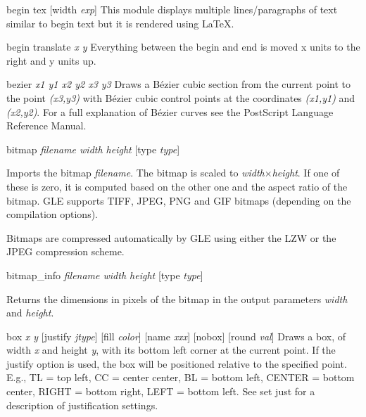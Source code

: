 \begin{commanddescription}
\item[{\sf begin tex [width {\it exp}] }  ]
 This module displays multiple lines/paragraphs of text similar to begin text but it is rendered using \LaTeX.


\item[{\sf begin translate {\it x y}}]
 Everything between the {\sf begin} and {\sf end} is moved
x units to the right and y units up.

\item[{\sf bezier {\it x1 y1 x2 y2 x3 y3}}]
Draws a B\'{e}zier cubic section from the current point to the point
{\it (x3,y3)} with B\'{e}zier cubic control points at the coordinates
{\it (x1,y1)} and {\it (x2,y2)}.  For a full explanation of B\'{e}zier curves
see the PostScript Language Reference Manual.


\item[{\sf bitmap {\it filename width height} [type {\it type}]}]

Imports the bitmap \textit{filename}. The bitmap is scaled to \textit{width}$\times$\textit{height}. If one of these is zero, it is computed based on the other one and the aspect ratio of the bitmap. GLE supports TIFF, JPEG, PNG and GIF bitmaps (depending on the compilation options).

Bitmaps are compressed automatically by GLE using either the LZW or the JPEG compression scheme.

\item[{\sf bitmap\_info {\it filename width height} [type {\it type}]}]

Returns the dimensions in pixels of the bitmap in the output parameters \textit{width} and \textit{height}.


\item[{\sf box {\it x y} [justify {\it jtype}] [fill {\it color}] [name {\it xxx}] [nobox] [round {\it val}]} ]
Draws a box, of width {\it x} and height {\it y}, with its bottom left corner
at the current point.  If the justify option is used, the box will
be positioned relative to the specified point. E.g.,  TL = top left,
CC = center center, BL = bottom left, CENTER = bottom center,
RIGHT = bottom right, LEFT = bottom left.  See {\sf set just} for a description
of justification settings.


\end{commanddescription}
